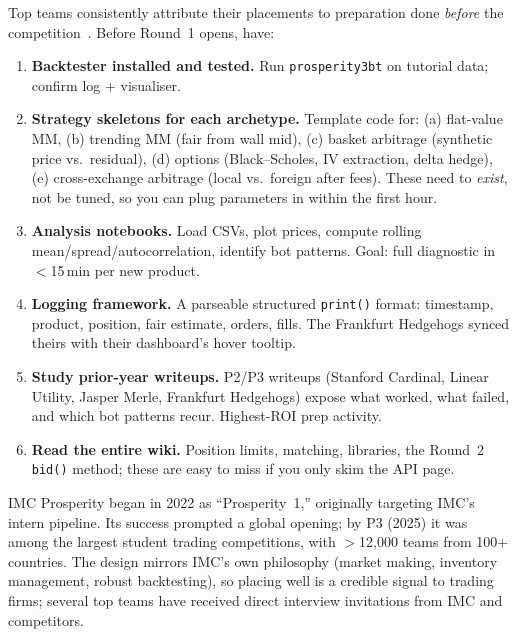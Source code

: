 Top teams consistently attribute their placements to preparation done
\emph{before} the competition~\citep{frankfurthedgehogs2025}.  Before
Round~1 opens, have:

\begin{enumerate}
  \item \textbf{Backtester installed and tested.}  Run
  \texttt{prosperity3bt} on tutorial data; confirm log + visualiser.

  \item \textbf{Strategy skeletons for each archetype.}  Template code
  for: (a) flat-value MM, (b) trending MM (fair from wall mid), (c)
  basket arbitrage (synthetic price vs.\ residual), (d) options
  (Black--Scholes, IV extraction, delta hedge), (e) cross-exchange
  arbitrage (local vs.\ foreign after fees).  These need to
  \emph{exist}, not be tuned, so you can plug parameters in within the
  first hour.

  \item \textbf{Analysis notebooks.}  Load CSVs, plot prices, compute
  rolling mean/spread/autocorrelation, identify bot patterns.  Goal: full
  diagnostic in $<$15\,min per new product.

  \item \textbf{Logging framework.}  A parseable structured
  \texttt{print()} format: timestamp, product, position, fair estimate,
  orders, fills.  The Frankfurt Hedgehogs synced theirs with their
  dashboard's hover tooltip.

  \item \textbf{Study prior-year writeups.}  P2/P3 writeups (Stanford
  Cardinal, Linear Utility, Jasper Merle, Frankfurt Hedgehogs) expose
  what worked, what failed, and which bot patterns recur.
  Highest-ROI prep activity.

  \item \textbf{Read the entire wiki.}  Position limits, matching,
  libraries, the Round~2 \texttt{bid()} method; these are easy to miss
  if you only skim the API page.
\end{enumerate}

\begin{historybox}
IMC Prosperity began in 2022 as ``Prosperity~1,'' originally targeting
IMC's intern pipeline.  Its success prompted a global opening; by P3
(2025) it was among the largest student trading competitions, with
$>$12{,}000 teams from 100+ countries.  The design mirrors IMC's own
philosophy (market making, inventory management, robust
backtesting), so placing well is a credible signal to trading firms;
several top teams have received direct interview invitations from IMC
and competitors.
\end{historybox}

